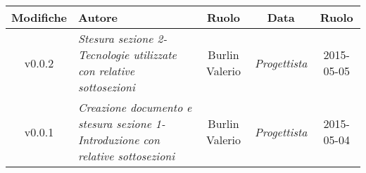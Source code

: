 \newpage

\begin{table}[h]
\centering
\begin{tabular}{|c|p{}|c|c|c|}
	\toprule
	\textbf{Modifiche} & \textbf{Autore} & \textbf{Ruolo} & \textbf{Data} & \textbf{Ruolo} \\
	\midrule
	\midrule
		v0.0.2 & \textit{Stesura sezione 2-Tecnologie utilizzate con relative sottosezioni} & Burlin Valerio & \textit{Progettista} & 2015-05-05\\
	\midrule
		v0.0.1 & \textit{Creazione documento e stesura sezione 1-Introduzione con relative sottosezioni} & Burlin Valerio & \textit{Progettista} & 2015-05-04\\
	\bottomrule
\end{tabular}
\end{table}
\newpage
